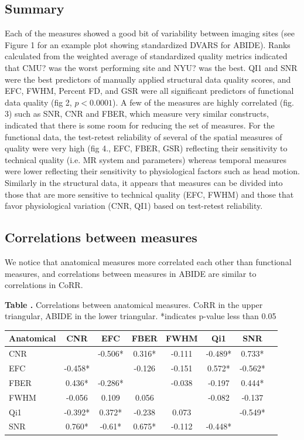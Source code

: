 \documentclass{frontiersSCNS} %
\begin{document}
\subsection{Summary}
Each of the measures showed a good bit of variability between imaging sites (see Figure 1 for an example plot showing standardized DVARS for ABIDE). Ranks calculated from the weighted average of standardized quality metrics indicated that CMU? was the worst performing site and NYU? was the best. QI1 and SNR were the best predictors of manually applied structural data quality scores, and EFC, FWHM, Percent FD, and GSR were all significant predictors of functional data quality (fig 2, $p < 0.0001$). A few of the measures are highly correlated (fig. 3) such as SNR, CNR and FBER, which measure very similar constructs, indicated that there is some room for reducing the set of measures. For the functional data, the test­-retest reliability of several of the spatial measures of quality were very high (fig 4., EFC, FBER, GSR) reflecting their sensitivity to technical quality (i.e. MR system and parameters) whereas temporal measures were lower reflecting their sensitivity to physiological factors such as head motion. Similarly in the structural data, it appears that measures can be divided into those that are more sensitive to technical quality (EFC, FWHM) and those that favor physiological variation (CNR, QI1) based on test­-retest reliability.

\subsection{Correlations between measures}
We notice that anatomical measures more correlated each other than functional measures, and correlations between measures in ABIDE are similar to correlations in CoRR.

\begin{table}[ht!]
\textbf{\label{tab_anat_cor} Table .}{ Correlations between anatomical measures. CoRR in the upper triangular, ABIDE in the lower triangular. *indicates p-value less than 0.05 }
\processtable{}
{\begin{tabular}{ l c c c c c c p{1.5cm}}\\
        \hline
         Anatomical & CNR & EFC & FBER & FWHM & Qi1 & SNR \\
        \hline
        CNR &  & -0.506* & 0.316* & -0.111 & -0.489* & 0.733* \\
        EFC & -0.458* &  & -0.126 & -0.151 & 0.572* & -0.562* \\
        FBER & 0.436* & -0.286* & & -0.038 & -0.197 & 0.444* \\
        FWHM & -0.056 & 0.109 & 0.056 & & -0.082 & -0.137 \\
        Qi1 & -0.392* & 0.372* & -0.238 & 0.073 & & -0.549* \\
        SNR & 0.760* & -0.61* & 0.675* & -0.112 & -0.448* & \\
        \hline
        \end{tabular}}{}
\end{table}
\end{document}
